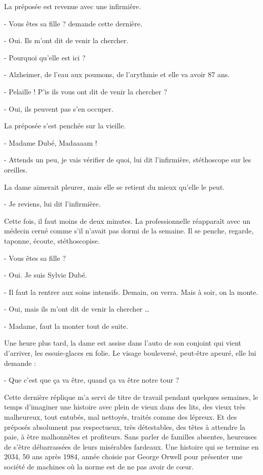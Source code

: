 La préposée est revenue avec une infirmière.

- Vous êtes sa fille ? demande cette dernière.

- Oui. Ils m’ont dit de venir la chercher.

- Pourquoi qu’elle est ici ?

- Alzheimer, de l’eau aux poumons, de l’arythmie et elle va avoir 87 ans.

- Pelaille ! P’is ils vous ont dit de venir la chercher ?

- Oui, ils peuvent pas s’en occuper.

La préposée s’est penchée sur la vieille.

- Madame Dubé, Madaaaam !

- Attends un peu, je vais vérifier de quoi, lui dit l’infirmière, stéthoscope sur les oreilles.

La dame aimerait pleurer, mais elle se retient du mieux qu’elle le peut.

- Je reviens, lui dit l’infirmière.

Cette fois, il faut moins de deux minutes. La professionnelle réapparaît avec un médecin cerné comme s’il n’avait pas dormi de la semaine. Il se penche, regarde, taponne, écoute, stéthoscopise.

- Vous êtes sa fille ?

- Oui. Je suis Sylvie Dubé.

- Il faut la rentrer aux soins intensifs. Demain, on verra. Mais à soir, on la monte.

- Oui, mais ils m’ont dit de venir la chercher …

- Madame, faut la monter tout de suite.

Une heure plus tard, la dame est assise dans l’auto de son conjoint qui vient d’arriver, les essuie-glaces en folie. Le visage bouleversé, peut-être apeuré, elle lui demande :

- Que c’est que ça va être, quand ça va être notre tour ?

Cette dernière réplique m’a servi de titre de travail pendant quelques semaines, le temps d’imaginer une histoire avec plein de vieux dans des lits, des vieux très malheureux, tout entubés, mal nettoyés, traités comme des lépreux. Et des préposés absolument pas respectueux, très détestables, des têtes à attendre la paie, à être malhonnêtes et profiteurs. Sans parler de familles absentes, heureuses de s’être débarrassées de leurs misérables fardeaux. Une histoire qui se termine en 2034, 50 ans après 1984, année choisie par George Orwell pour présenter une société de machines où la norme est de ne pas avoir de cœur.

